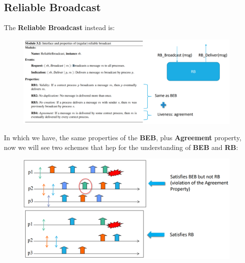 \documentclass{article}
\begin{document}
\subsection{Reliable Broadcast}
 The \textbf{Reliable Broadcast} instead is:
\begin{figure}[H]
  \centering
  \includegraphics[scale=1,left]{cattura32.png}
\end{figure}
In which we have, the same properties of the \textbf{BEB}, plus \textbf{Agreement} property, now we will see two schemes that hep for the understanding of \textbf{BEB} and \textbf{RB}:
\begin{figure}[H]
  \centering
  \includegraphics[scale=1,left]{cattura33.png}
\end{figure}
\end{document}
